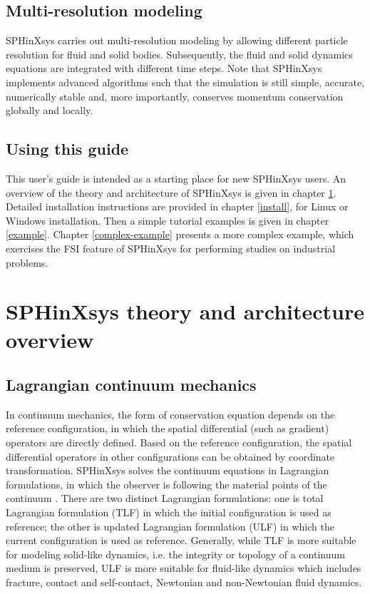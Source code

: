 \documentclass[12pt, a4paper,onecolumn]{article}
\begin{document}
\subsection{Multi-resolution modeling}
SPHinXsys carries out multi-resolution modeling 
by allowing different particle resolution for fluid and solid bodies. 
Subsequently, the fluid and solid dynamics equations are integrated with different time steps.
Note that SPHinXsys implements advanced algorithms 
such that the simulation is still simple, accurate, numerically stable and,
 more importantly, conserves momentum conservation globally and locally.
%
\subsection{Using this guide}
This user's guide is intended as a starting place for new SPHinXsys users. 
An overview of the theory and architecture of SPHinXsys is given in chapter \ref{theory}. 
Detailed installation instructions are provided in chapter \ref{install}, for Linux or Windows installation. Then a simple tutorial examples is given in chapter \ref{example}. Chapter \ref{complex-example} presents a more complex example, 
which exercises the FSI feature of SPHinXsys for performing studies on industrial problems.
%
\newpage
\section{SPHinXsys theory and architecture overview}\label{theory}  
\subsection{Lagrangian continuum mechanics}
In continuum mechanics, 
the form of conservation equation depends on the reference configuration,
in which the spatial differential (such as gradient) operators are directly defined. 
Based on the reference configuration, the spatial differential operators 
in other configurations can be obtained by coordinate transformation.
SPHinXsys solves the continuum equations in Lagrangian formulations, 
in which the observer is following the material points of the continuum \cite{Han2018}. 
There are two distinct Lagrangian formulations: one is total Lagrangian formulation (TLF) 
in which the initial configuration is used as reference; 
the other is updated Lagrangian formulation (ULF) 
in which the current configuration is used as reference.   
Generally, while TLF is more suitable for modeling solid-like dynamics,
i.e. the integrity or topology of a continuum medium is preserved, 
ULF is more suitable for fluid-like dynamics 
which includes fracture, contact and self-contact, Newtonian and non-Newtonian fluid dynamics. 
%
\end{document}
